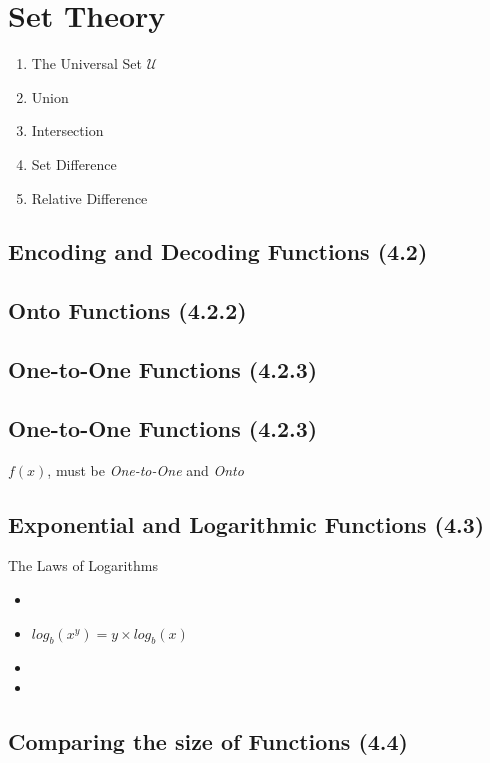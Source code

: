 \documentclass{article}
\begin{document}
\section{Set Theory}
\begin{enumerate}
\item The Universal Set $\mathcal{U}$
\item Union
\item Intersection
\item Set Difference
\item Relative Difference
\end{enumerate}

\newpage




\subsection*{Encoding and Decoding Functions (4.2)}


\subsection*{Onto Functions (4.2.2)}

\subsection*{One-to-One Functions (4.2.3)}


\subsection*{One-to-One Functions (4.2.3)}
$f(x)$, must be \emph{One-to-One} and \emph{Onto}



\subsection*{Exponential and Logarithmic Functions (4.3)}

The Laws of Logarithms
\begin{itemize}
\item
\item $log_b(x^y) = y \times log_b(x)$
\item
\item
\end{itemize}

\subsection*{Comparing the size of Functions (4.4)}
\end{document}
